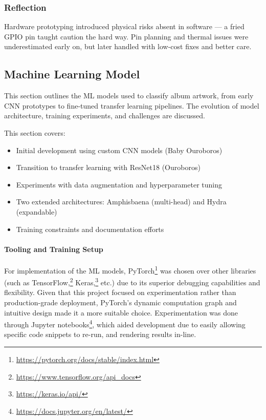             \subsubsection*{Reflection}
                Hardware prototyping introduced physical risks absent in software — a fried GPIO pin taught caution the hard way. Pin planning and thermal issues were underestimated early on, but later handled with low-cost fixes and better care.
    
      \subsection{Machine Learning Model} \label{sec:mlImp}
    
            This section outlines the ML models used to classify album artwork, from early CNN prototypes to fine-tuned transfer learning pipelines. The evolution of model architecture, training experiments, and challenges are discussed.
    
            This section covers:
            \begin{itemize}
              \item Initial development using custom CNN models (Baby Ouroboros)
              \item Transition to transfer learning with ResNet18 (Ouroboros)
              \item Experiments with data augmentation and hyperparameter tuning
              \item Two extended architectures: Amphisbaena (multi-head) and Hydra (expandable)
              \item Training constraints and documentation efforts
            \end{itemize}
    
            \paragraph{Tooling and Training Setup}
    
            For implementation of the ML models, PyTorch\footnote{\url{https://pytorch.org/docs/stable/index.html}} was chosen over other libraries (such as TensorFlow,\footnote{\url{https://www.tensorflow.org/api_docs}} Keras,\footnote{\url{https://keras.io/api/}} etc.) due to its superior debugging capabilities and flexibility. Given that this project focused on experimentation rather than production-grade deployment, PyTorch's dynamic computation graph and intuitive design made it a more suitable choice. Experimentation was done through Jupyter notebooks\footnote{\url{https://docs.jupyter.org/en/latest/}}, which aided development due to easily allowing specific code snippets to re-run, and rendering results in-line.
    
